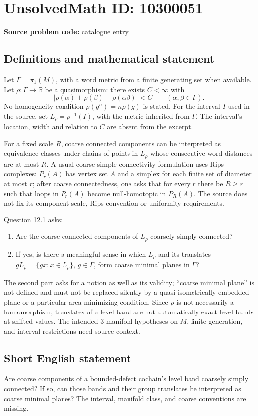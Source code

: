 \documentclass[11pt]{article}
\newcommand{\R}{\mathbb{R}}
\begin{document}
\section*{UnsolvedMath ID: 10300051}
\textbf{Source problem code:} catalogue entry
\subsection{Definitions and mathematical statement}
Let \(\Gamma=\pi_1(M)\), with a word metric from a finite generating set when available. Let \(\rho:\Gamma\to\R\) be a quasimorphism: there exists \(C<\infty\) with
\[
 |\rho(\alpha)+\rho(\beta)-\rho(\alpha\beta)|<C
 \qquad(\alpha,\beta\in\Gamma).
\]
No homogeneity condition \(\rho(g^n)=n\rho(g)\) is stated. For the interval \(I\) used in the source, set \(L_\rho=\rho^{-1}(I)\), with the metric inherited from \(\Gamma\). The interval's location, width and relation to \(C\) are absent from the excerpt.

For a fixed scale \(R\), coarse connected components can be interpreted as equivalence classes under chains of points in \(L_\rho\) whose consecutive word distances are at most \(R\). A usual coarse simple-connectivity formulation uses Rips complexes: \(P_r(A)\) has vertex set \(A\) and a simplex for each finite set of diameter at most \(r\); after coarse connectedness, one asks that for every \(r\) there be \(R\geq r\) such that loops in \(P_r(A)\) become null-homotopic in \(P_R(A)\). The source does not fix its component scale, Rips convention or uniformity requirements.

Question 12.1 asks:
\begin{enumerate}
\item Are the coarse connected components of \(L_\rho\) coarsely simply connected?
\item If yes, is there a meaningful sense in which \(L_\rho\) and its translates \(gL_\rho=\{gx:x\in L_\rho\}\), \(g\in\Gamma\), form coarse minimal planes in \(\Gamma\)?
\end{enumerate}
The second part asks for a notion as well as its validity; ``coarse minimal plane'' is not defined and must not be replaced silently by a quasi-isometrically embedded plane or a particular area-minimizing condition. Since \(\rho\) is not necessarily a homomorphism, translates of a level band are not automatically exact level bands at shifted values. The intended 3-manifold hypotheses on \(M\), finite generation, and interval restrictions need source context.
\subsection{Short English statement}
Are coarse components of a bounded-defect cochain's level band coarsely simply connected? If so, can those bands and their group translates be interpreted as coarse minimal planes? The interval, manifold class, and coarse conventions are missing.
\end{document}
